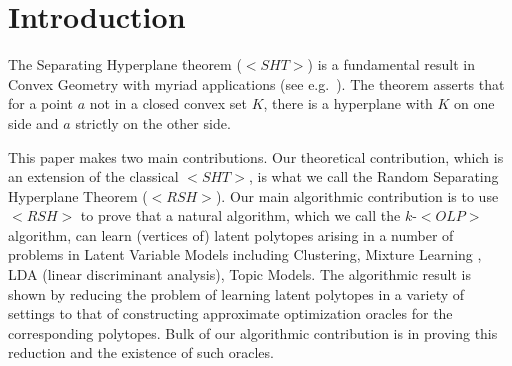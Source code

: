 \documentclass[11pt,letterpaper]{article}
\newcounter{note}[section]
\renewcommand{\thenote}{\thesection.\arabic{note}}
\newcommand{\aknote}[1]{\refstepcounter{note}$\ll${\bf Amit~\thenote:}
  {\sf \color{blue} #1}$\gg$\marginpar{\tiny\bf AK~\thenote}}
\def\mathsf#1{<#1>}%
\def\xspace{}%
\theoremstyle{definition}
\theoremstyle{remark}
\newcommand{\rsh}{{\mathsf {RSH}}\xspace}
\newcommand{\sht}{{\mathsf {SHT}}\xspace}
\newcommand{\olp}{{\mathsf {OLP}}\xspace}
\newcommand{\kolp}{k\mbox{-}\olp}
\begin{document}
\section{Introduction}
The Separating Hyperplane theorem ($\sht$) is a fundamental result in Convex Geometry with myriad applications (see e.g.~\cite{bertsekas2009convex}). The theorem asserts that for a point $a$ not in a closed convex set $K$, there is a hyperplane with $K$ on one side and $a$ strictly on the other side. 


This paper makes two main contributions.
Our theoretical contribution, which is an extension of the classical $\sht$,  is what we call the Random Separating Hyperplane Theorem ($\rsh$). Our main algorithmic contribution is to use $\rsh$ to prove that a natural algorithm, which we call the $\kolp$ algorithm, can learn (vertices of) latent polytopes arising in a number of problems in Latent Variable Models including Clustering, Mixture Learning , LDA (linear discriminant analysis), Topic Models.  The algorithmic result is shown by reducing the problem of learning latent polytopes in a variety of settings to that of constructing approximate optimization oracles for the corresponding polytopes. Bulk of our algorithmic contribution is in proving this reduction and the existence of such oracles. 





\vspace*{-0.1in}
\end{document}
